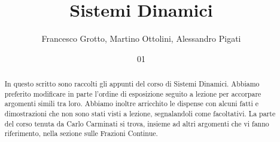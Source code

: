 \documentclass[italian,course]{Notes}
\title{Sistemi Dinamici}
\author{Francesco Grotto, Martino Ottolini, Alessandro Pigati}
\date{01}{10}{2014}
\theoremstyle{plainsc}
\begin{document}
\newpage

\begin{abstract}
 In questo scritto sono raccolti gli appunti del corso di Sistemi Dinamici. 
 Abbiamo preferito modificare in parte l'ordine di esposizione seguito a lezione per accorpare argomenti simili tra loro. 
 Abbiamo inoltre arricchito le dispense con alcuni fatti e dimostrazioni che non sono stati visti a lezione, segnalandoli come facoltativi. 
 La parte del corso tenuta da Carlo Carminati si trova, insieme ad altri argomenti che vi fanno riferimento, nella sezione sulle Frazioni Continue.
\end{abstract}








\end{document}
